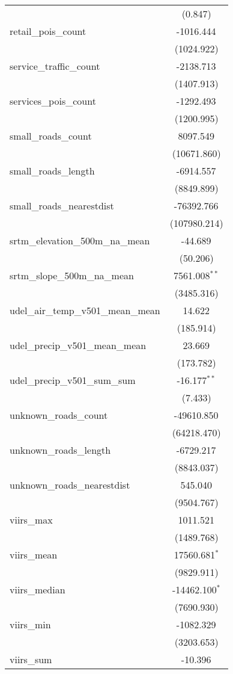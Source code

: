 \begin{table}[!htbp]
\begin{tabular}{@{\extracolsep{5pt}}lc}
  & (0.847) \\
 retail_pois_count & -1016.444$^{}$ \\
  & (1024.922) \\
 service_traffic_count & -2138.713$^{}$ \\
  & (1407.913) \\
 services_pois_count & -1292.493$^{}$ \\
  & (1200.995) \\
 small_roads_count & 8097.549$^{}$ \\
  & (10671.860) \\
 small_roads_length & -6914.557$^{}$ \\
  & (8849.899) \\
 small_roads_nearestdist & -76392.766$^{}$ \\
  & (107980.214) \\
 srtm_elevation_500m_na_mean & -44.689$^{}$ \\
  & (50.206) \\
 srtm_slope_500m_na_mean & 7561.008$^{**}$ \\
  & (3485.316) \\
 udel_air_temp_v501_mean_mean & 14.622$^{}$ \\
  & (185.914) \\
 udel_precip_v501_mean_mean & 23.669$^{}$ \\
  & (173.782) \\
 udel_precip_v501_sum_sum & -16.177$^{**}$ \\
  & (7.433) \\
 unknown_roads_count & -49610.850$^{}$ \\
  & (64218.470) \\
 unknown_roads_length & -6729.217$^{}$ \\
  & (8843.037) \\
 unknown_roads_nearestdist & 545.040$^{}$ \\
  & (9504.767) \\
 viirs_max & 1011.521$^{}$ \\
  & (1489.768) \\
 viirs_mean & 17560.681$^{*}$ \\
  & (9829.911) \\
 viirs_median & -14462.100$^{*}$ \\
  & (7690.930) \\
 viirs_min & -1082.329$^{}$ \\
  & (3203.653) \\
 viirs_sum & -10.396$^{}$ \\

\end{tabular}
\end{table}
